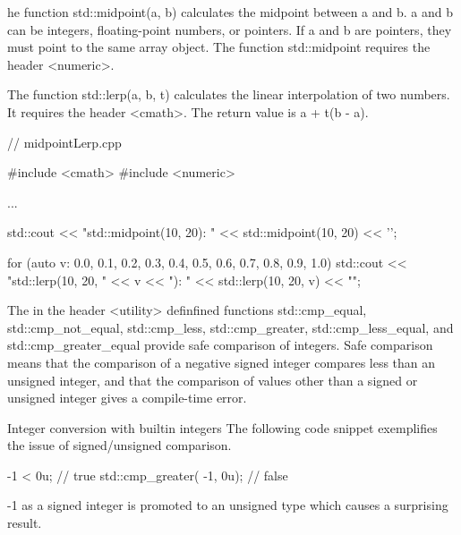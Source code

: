 he function std::midpoint(a, b) calculates the midpoint between a and b. a and b can be integers, floating-point numbers, or pointers. If a and b are pointers, they must point to the same array object.
The function std::midpoint requires the header <numeric>.

The function std::lerp(a, b, t) calculates the linear interpolation of two numbers. It requires the header <cmath>. The return value is a + t(b - a).



\begin{cpp}
// midpointLerp.cpp

#include <cmath>
#include <numeric>

...

std::cout << "std::midpoint(10, 20): " << std::midpoint(10, 20) << '\n';

for (auto v: {0.0, 0.1, 0.2, 0.3, 0.4, 0.5, 0.6, 0.7, 0.8, 0.9, 1.0}) {
	std::cout << "std::lerp(10, 20, " << v << "): " << std::lerp(10, 20, v) << "\n";
}
\end{cpp}





The in the header <utility> definfined functions std::cmp\_equal, std::cmp\_not\_equal, std::cmp\_less, std::cmp\_greater, std::cmp\_less\_equal, and std::cmp\_greater\_equal provide safe comparison of integers. Safe comparison means that the comparison of a negative signed integer compares less than an unsigned integer, and that the comparison of values other than a signed or unsigned integer gives a compile-time error.


\begin{myWarning}{Integer conversion with builtin integers}
The following code snippet exemplifies the issue of signed/unsigned comparison.

\begin{cpp}
-1 < 0u; // true
std::cmp_greater( -1, 0u); // false
\end{cpp}

-1 as a signed integer is promoted to an unsigned type which causes a surprising result.

\end{myWarning}


